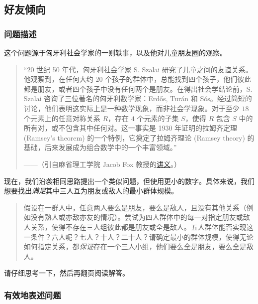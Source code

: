 \subsection{好友倾向}\label{sec:section1.4.4}

\subsubsection*{问题描述}

这个问题源于匈牙利社会学家的一则轶事，以及他对儿童朋友圈的观察。

\begin{quote}
    ``20 世纪 50 年代，匈牙利社会学家 S. Szalai 研究了儿童之间的友谊关系。他观察到，在任何大约 $20$ 个孩子的群体中，总能找到四个孩子，他们彼此都是朋友，或者四个孩子中没有任何两个是朋友。在得出社会学结论前，S. Szalai 咨询了三位著名的匈牙利数学家：Erdős, Turán 和 Sós。经过简短的讨论，他们表明这实际上是一种数学现象，而非社会学现象。对于至少 $18$ 个元素上的任意对称关系 $R$，存在 $4$ 个元素的子集 $S$，使得 $R$ 包含 $S$ 中的所有对，或不包含其中任何对。这一事实是 1930 年证明的拉姆齐定理 (Ramsey's theorem) 的一个特例，它奠定了拉姆齐理论 (Ramsey theory) 的基础，后来发展成为组合数学中的一个丰富领域。''\begin{flushright}——（引自麻省理工学院 Jacob Fox 教授的\href{https://math.mit.edu/~fox/MAT307-lecture01.pdf}{讲义}。）\end{flushright}
\end{quote}

现在，我们沿袭相同思路提出一个类似问题，但使用更小的数字。具体来说，我们想要找出\emph{满足}其中三人互为朋友或敌人的最小群体规模。

\begin{quote}
    假设在一群人中，任意两人要么是朋友，要么是敌人，且没有其他关系（例如没有熟人或亦敌亦友的情况）。尝试为四人群体中的每一对指定朋友或敌人关系，使得不存在三人组彼此都是朋友或全是敌人。五人群体能否实现这一条件？六人呢？七人？十人？二十人？请确定最小的群体规模，使得无论如何指定关系，都\emph{保证}存在一个三人小组，他们要么全是朋友，要么全是敌人。
\end{quote} 

请仔细思考一下，然后再翻页阅读解答。

\clearpage

\subsubsection*{有效地表述问题}

